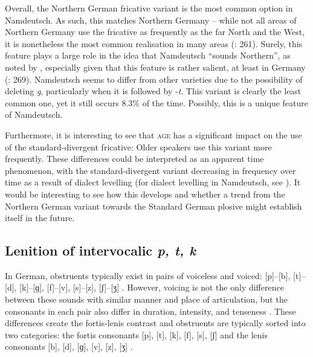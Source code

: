 \documentclass[output=paper]{langsci/langscibook}
\begin{document}
Overall, the Northern German fricative variant is the most common option in Namdeutsch. As such, this matches Northern Germany – while not all areas of Northern Germany use the fricative as frequently as the far North and the West, it is nonetheless the most common realisation in many areas (\citealt{elmentaler_norddeutscher_2015}: 261). Surely, this feature plays a large role in the idea that Namdeutsch “sounds Northern”, as noted by \citet[49]{kellermeier-rehbein_namslang_2015}, especially given that this feature is rather salient, at least in Germany (\citealt{elmentaler_norddeutscher_2015}: 269). Namdeutsch seems to differ from other varieties due to the possibility of deleting \textit{g}, particularly when it is followed by -\textit{t}. This variant is clearly the least common one, yet it still occurs 8.3\% of the time. Possibly, this is a unique feature of Namdeutsch.


Furthermore, it is interesting to see that \textsc{age} has a significant impact on the use of the standard-divergent fricative: Older speakers use this variant more frequently. These differences could be interpreted as an apparent time phenomenon, with the standard-divergent variant decreasing in frequency over time as a result of dialect levelling (for dialect levelling in Namdeutsch, see \citealt{zimmer_siedlungsgeschichte_nodate}). It would be interesting to see how this develops and whether a trend from the Northern German variant towards the Standard German plosive might establish itself in the future.


\subsection{Lenition of intervocalic \textit{p, t, k}}
\label{sec:stuhl:4.5}

In German, obstruents typically exist in pairs of voiceless and voiced: [p]--[b], [t]--[d], [k]--[ɡ], [f]--[v], [s]--[z], [ʃ]--[ʒ] \citep[53]{kleiner_duden_2015}. However, voicing is not the only difference between these sounds with similar manner and place of articulation, but the consonants in each pair also differ in duration, intensity, and tenseness \citep[53]{kleiner_duden_2015}. These differences create the fortis-lenis contrast and obstruents are typically sorted into two categories: the fortis consonants [p], [t], [k], [f], [s], [ʃ] and the lenis consonants [b], [d], [ɡ], [v], [z], [ʒ] \citep[53]{kleiner_duden_2015}. 
\end{document}
